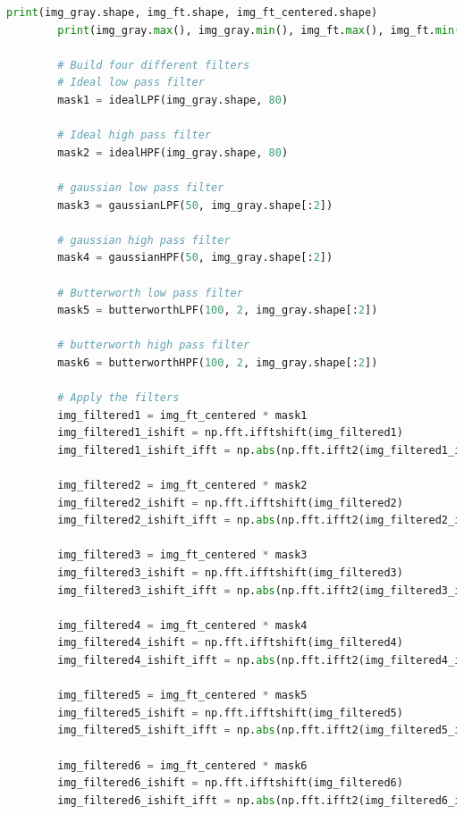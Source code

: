\documentclass{article}
\begin{document}
{\begin{lstlisting}[language=Python, caption=Code for applying filters in frequency domain]
        print(img_gray.shape, img_ft.shape, img_ft_centered.shape)
        print(img_gray.max(), img_gray.min(), img_ft.max(), img_ft.min(), img_ft_centered.max(), img_ft_centered.min())
    
        # Build four different filters
        # Ideal low pass filter
        mask1 = idealLPF(img_gray.shape, 80)
    
        # Ideal high pass filter
        mask2 = idealHPF(img_gray.shape, 80)
    
        # gaussian low pass filter
        mask3 = gaussianLPF(50, img_gray.shape[:2]) 
    
        # gaussian high pass filter
        mask4 = gaussianHPF(50, img_gray.shape[:2])
    
        # Butterworth low pass filter
        mask5 = butterworthLPF(100, 2, img_gray.shape[:2])
    
        # butterworth high pass filter
        mask6 = butterworthHPF(100, 2, img_gray.shape[:2])
        
        # Apply the filters
        img_filtered1 = img_ft_centered * mask1
        img_filtered1_ishift = np.fft.ifftshift(img_filtered1)
        img_filtered1_ishift_ifft = np.abs(np.fft.ifft2(img_filtered1_ishift))
    
        img_filtered2 = img_ft_centered * mask2
        img_filtered2_ishift = np.fft.ifftshift(img_filtered2)
        img_filtered2_ishift_ifft = np.abs(np.fft.ifft2(img_filtered2_ishift))
    
        img_filtered3 = img_ft_centered * mask3
        img_filtered3_ishift = np.fft.ifftshift(img_filtered3)
        img_filtered3_ishift_ifft = np.abs(np.fft.ifft2(img_filtered3_ishift))
    
        img_filtered4 = img_ft_centered * mask4
        img_filtered4_ishift = np.fft.ifftshift(img_filtered4)
        img_filtered4_ishift_ifft = np.abs(np.fft.ifft2(img_filtered4_ishift))
    
        img_filtered5 = img_ft_centered * mask5
        img_filtered5_ishift = np.fft.ifftshift(img_filtered5)
        img_filtered5_ishift_ifft = np.abs(np.fft.ifft2(img_filtered5_ishift))
    
        img_filtered6 = img_ft_centered * mask6
        img_filtered6_ishift = np.fft.ifftshift(img_filtered6)
        img_filtered6_ishift_ifft = np.abs(np.fft.ifft2(img_filtered6_ishift))
    

\end{lstlisting}}
\end{document}
